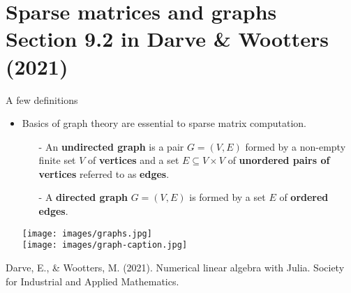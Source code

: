 \documentclass[t,usepdftitle=false]{beamer}
\begin{document}
\section{Sparse matrices and graphs\\{\small Section 9.2 in Darve \& Wootters (2021)}}

\begin{frame}{A few definitions}
\begin{itemize}
\item Basics of graph theory are essential to sparse matrix computation.
\begin{definition}[Graph]
\begin{itemize}
\item[-] An \textbf{undirected graph} is a pair $G=(V,E)$ formed by a non-empty finite set $V$ of \textbf{vertices} and a set $E\subseteq V\times V$ of \textbf{unordered pairs of vertices} referred to as \textbf{edges}.\vspace{-.1cm}
\item[-] A \textbf{directed graph} $G=(V,E)$ is formed by a set $E$ of \textbf{ordered edges}.
\end{itemize}
\end{definition}
\vspace{.15cm}
\begin{center}
\texttt{[image: images/graphs.jpg]}\\
\texttt{[image: images/graph-caption.jpg]}
\end{center}
\end{itemize}
\tiny{Darve, E., \& Wootters, M. (2021). Numerical linear algebra with Julia. Society for Industrial and Applied Mathematics.}
\end{frame}
\end{document}
